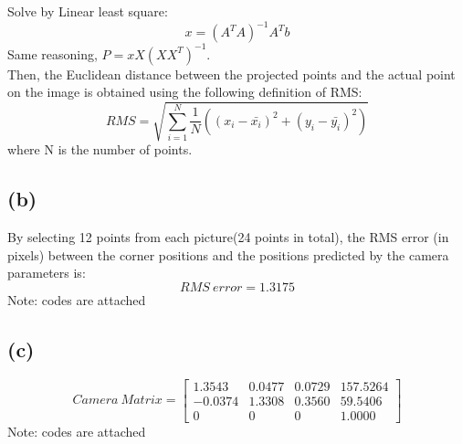 \documentclass[letterpaper]{article}
\begin{document}
Solve by Linear least square:\\
$$x = (A^T A)^{-1}A^Tb$$
Same reasoning, $P = xX(XX^T)^{-1}$.\\
Then, the Euclidean distance between the projected points and the actual point on the image is obtained using the following definition of RMS:\\
$$RMS=\sqrt{\sum_{i=1}^{N}\frac{1}{N}((x_i-\bar{x_i})^2+(y_i-\bar{y_i})^2)}$$
where N is the number of points.
\subsection*{(b)}
By selecting 12 points from each picture(24 points in total), the RMS error (in pixels) between the corner positions and the positions predicted by the camera parameters is:
$$RMS\ error =  1.3175$$
Note: codes are attached
\subsection*{(c)}
$$Camera\ Matrix = \begin{bmatrix}
    1.3543  &  0.0477  &  0.0729 & 157.5264\\
   -0.0374   & 1.3308   & 0.3560  & 59.5406\\
         0    &     0      &   0   & 1.0000
\end{bmatrix}$$
Note: codes are attached
\end{document}
